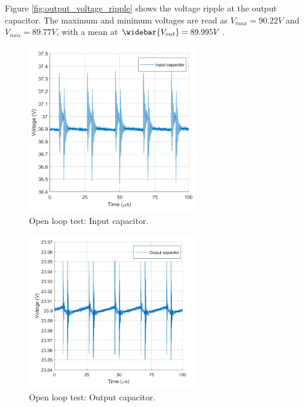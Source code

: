 Figure \ref{fig:output_voltage_ripple} shows the voltage ripple at the output capacitor. The maximum and minimum voltages are read as $V_{max} = 90.22V$ and $V_{min} = 89.77V$, with a mean at $\widebar{V_{out}} = 89.995V$.


\begin{figure}[H]
	\begin{center}
		\includegraphics[width=0.65\textwidth]{../Pictures/P1/Test/Openloopinputcapacitor}
		\caption{Open loop test: Input capacitor.}
		\label{Openlooptestinputcapacitor}
	\end{center}	
\end{figure}

\begin{figure}[H]
	\begin{center}
		\includegraphics[width=0.65\textwidth]{../Pictures/P1/Test/Openloopoutputcapacitor}
		\caption{Open loop test: Output capacitor.}
		\label{Openlooptestoutputtcapacitor}
	\end{center}	
\end{figure}

